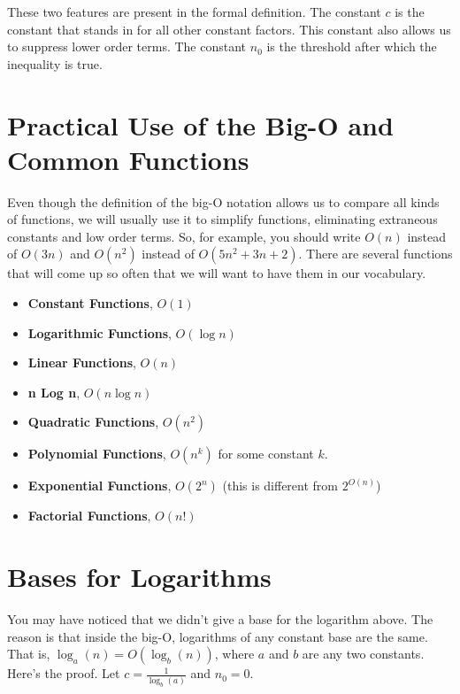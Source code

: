 These two features are present in the formal definition.
The constant $c$ is the constant that stands in for all other constant factors.
This constant also allows us to suppress lower order terms.
The constant $n_0$ is the threshold after which the inequality is true.

\section{Practical Use of the Big-O and Common Functions}


Even though the definition of the big-O notation allows us to compare all kinds of functions, we will usually use it to simplify functions, eliminating extraneous constants and low order terms.
So, for example, you should write $O(n)$ instead of $O(3n)$ and $O(n^2)$ instead of $O(5n^2 + 3n + 2)$.
There are several functions that will come up so often that we will want to have them in our vocabulary.

\begin{itemize}

\item \textbf{Constant Functions}, $O(1)$

\item \textbf{Logarithmic Functions}, $O(\log n)$

\item \textbf{Linear Functions}, $O(n)$

\item \textbf{n Log n}, $O(n\log n)$

\item \textbf{Quadratic Functions}, $O(n^2)$

\item \textbf{Polynomial Functions}, $O(n^k)$ for some constant $k$.

\item \textbf{Exponential Functions}, $O(2^n)$ (this is different from $2^{O(n)}$)

\item \textbf{Factorial Functions}, $O(n!)$

\end{itemize}
\section{Bases for Logarithms}


You may have noticed that we didn't give a base for the logarithm above.
The reason is that inside the big-O, logarithms of any constant base are the same.
That is, $\log_a(n) = O(\log_b(n))$, where $a$ and $b$ are any two constants.
Here's the proof.
Let $c = \frac{1}{\log_b(a)}$ and $n_0 = 0$.  


